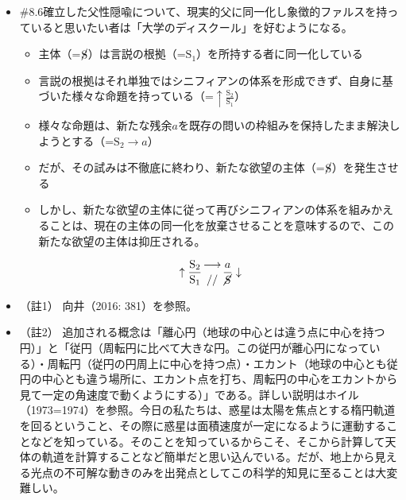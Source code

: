 \begin{note}{}
  \begin{itemize}
    \tightlist
    \item{\#8.6}確立した父性隠喩について、現実的父に同一化し象徴的ファルスを持っていると思いたい者は「大学のディスクール」を好むようになる。
      \begin{itemize}
        \tightlist
        \item 主体（=$\cancel{\textrm{S}}$）は言説の根拠（=$\textrm{S}_1$）を所持する者に同一化している
        \item 言説の根拠はそれ単独ではシニフィアンの体系を形成できず、自身に基づいた様々な命題を持っている（=$\uparrow\frac{\textrm{S}_2}{\textrm{S}_1}$）
        \item 様々な命題は、新たな残余$a$を既存の問いの枠組みを保持したまま解決しようとする（=$\textrm{S}_2\rightarrow a$）
        \item だが、その試みは不徹底に終わり、新たな欲望の主体（=$\cancel{\textrm{S}}$）を発生させる
        \item しかし、新たな欲望の主体に従って再びシニフィアンの体系を組みかえることは、現在の主体の同一化を放棄させることを意味するので、この新たな欲望の主体は抑圧される。
      \end{itemize}

$$
\uparrow\frac{\mathrm{S_2}}{\mathrm{S_1}}\genfrac{}{}{0pt}{}{\longrightarrow}{//}\frac{a}{\mathrm{\cancel{S}}}\downarrow
$$
  \end{itemize}
\end{note}

\begin{itemize}
\tightlist
\item
  （註1） 向井（2016: 381）\cite{Mukai}を参照。
\item
  （註2）
  追加される概念は「離心円（地球の中心とは違う点に中心を持つ円）」と「従円（周転円に比べて大きな円。この従円が離心円になっている）・周転円（従円の円周上に中心を持つ点）・エカント（地球の中心とも従円の中心とも違う場所に、エカント点を打ち、周転円の中心をエカントから見て一定の角速度で動くようにする）」である。詳しい説明はホイル（1973=1974）\cite{Hoyle}を参照。今日の私たちは、惑星は太陽を焦点とする楕円軌道を回るということ、その際に惑星は面積速度が一定になるように運動することなどを知っている。そのことを知っているからこそ、そこから計算して天体の軌道を計算することなど簡単だと思い込んでいる。だが、地上から見える光点の不可解な動きのみを出発点としてこの科学的知見に至ることは大変難しい。
\end{itemize}

